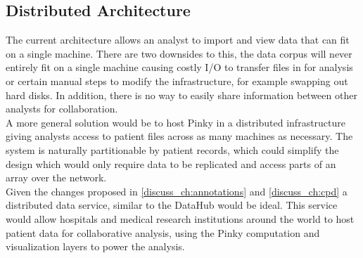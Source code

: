 \subsection{Distributed Architecture}\label{discuss_ch:dist-arch}

The current architecture allows an analyst to import and view data that can fit
on a single machine. There are two downsides to this, the data corpus will
never entirely fit on a single machine causing costly I/O to transfer files in
for analysis or certain manual steps to modify the infrastructure, for example
swapping out hard disks. In addition, there is no way to easily share
information between other analysts for collaboration. \\

A more general solution would be to host Pinky in a distributed infrastructure
giving analysts access to patient files across as many machines as necessary.
The system is naturally partitionable by patient records, which could simplify
the design which would only require data to be replicated and access parts of
an array over the network. \\

Given the changes proposed in \ref{discuss_ch:annotations} and \ref{discuss_ch:cpd} a
distributed data service, similar to the DataHub\cite{datahub} would be ideal.
This service would allow hospitals and medical research institutions around the
world to host patient data for collaborative analysis, using the Pinky
computation and visualization layers to power the analysis.

